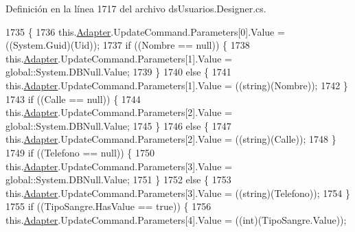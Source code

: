 Definición en la línea 1717 del archivo ds\-Usuarios.\-Designer.\-cs.


\begin{DoxyCode}
1735                                               \{
1736             this.\hyperlink{class_proyecto___integrador__3_1_1ds_usuarios_table_adapters_1_1_usuarios_table_adapter_a46252bad9dadbf20130beca25d50b5bc}{Adapter}.UpdateCommand.Parameters[0].Value = ((System.Guid)(Uid));
1737             \textcolor{keywordflow}{if} ((Nombre == null)) \{
1738                 this.\hyperlink{class_proyecto___integrador__3_1_1ds_usuarios_table_adapters_1_1_usuarios_table_adapter_a46252bad9dadbf20130beca25d50b5bc}{Adapter}.UpdateCommand.Parameters[1].Value = global::System.DBNull.Value;
1739             \}
1740             \textcolor{keywordflow}{else} \{
1741                 this.\hyperlink{class_proyecto___integrador__3_1_1ds_usuarios_table_adapters_1_1_usuarios_table_adapter_a46252bad9dadbf20130beca25d50b5bc}{Adapter}.UpdateCommand.Parameters[1].Value = ((string)(Nombre));
1742             \}
1743             \textcolor{keywordflow}{if} ((Calle == null)) \{
1744                 this.\hyperlink{class_proyecto___integrador__3_1_1ds_usuarios_table_adapters_1_1_usuarios_table_adapter_a46252bad9dadbf20130beca25d50b5bc}{Adapter}.UpdateCommand.Parameters[2].Value = global::System.DBNull.Value;
1745             \}
1746             \textcolor{keywordflow}{else} \{
1747                 this.\hyperlink{class_proyecto___integrador__3_1_1ds_usuarios_table_adapters_1_1_usuarios_table_adapter_a46252bad9dadbf20130beca25d50b5bc}{Adapter}.UpdateCommand.Parameters[2].Value = ((string)(Calle));
1748             \}
1749             \textcolor{keywordflow}{if} ((Telefono == null)) \{
1750                 this.\hyperlink{class_proyecto___integrador__3_1_1ds_usuarios_table_adapters_1_1_usuarios_table_adapter_a46252bad9dadbf20130beca25d50b5bc}{Adapter}.UpdateCommand.Parameters[3].Value = global::System.DBNull.Value;
1751             \}
1752             \textcolor{keywordflow}{else} \{
1753                 this.\hyperlink{class_proyecto___integrador__3_1_1ds_usuarios_table_adapters_1_1_usuarios_table_adapter_a46252bad9dadbf20130beca25d50b5bc}{Adapter}.UpdateCommand.Parameters[3].Value = ((string)(Telefono));
1754             \}
1755             \textcolor{keywordflow}{if} ((TipoSangre.HasValue == \textcolor{keyword}{true})) \{
1756                 this.\hyperlink{class_proyecto___integrador__3_1_1ds_usuarios_table_adapters_1_1_usuarios_table_adapter_a46252bad9dadbf20130beca25d50b5bc}{Adapter}.UpdateCommand.Parameters[4].Value = ((int)(TipoSangre.Value));

\end{DoxyCode}
